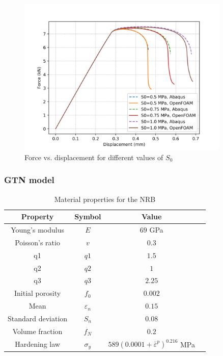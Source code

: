 \documentclass[sn-mathphys,Numbered,draft]{sn-jnl}%
\begin{document}
\begin{figure}[htb]
\begin{center}
	\includegraphics[width=0.9\textwidth]{./Figures/LemaitreCompare/borden/lemaitreBordenCompare.png}
\caption{Force vs. displacement for different values of $S_0$}
\label{fig:notchedRoundBAr}
\end{center}
\end{figure}
\FloatBarrier

\subsubsection{GTN model}

\begin{table}[htb]
	\centering
		\begin{tabular}{cccc} \hline
			Property & Symbol & Value  \\ \hline 
			Young's modulus & $E$ & $69$ GPa \\
			Poisson's ratio & $v$ & $0.3$   \\
			q1 & $q1$ & $1.5$  \\
		    q2 & $q2$ & $1$  \\
		    q3 & $q3$ & $2.25$  \\
		    Initial porosity & $f_0$ & $0.002$  \\
		    Mean & $\varepsilon_n$ & $0.15$  \\
		    Standard deviation & $S_n$ & $0.08$  \\
		    Volume fraction & $f_N$ & $0.2$  \\
			Hardening law & $\sigma_y$ & $589({0.0001+\bar{\varepsilon}}^p)^{0.216}$ MPa  \\
			\hline
		\end{tabular}
	\caption{Material properties for the NRB}
	\label{tab:material_properties}
\end{table}
\end{document}
